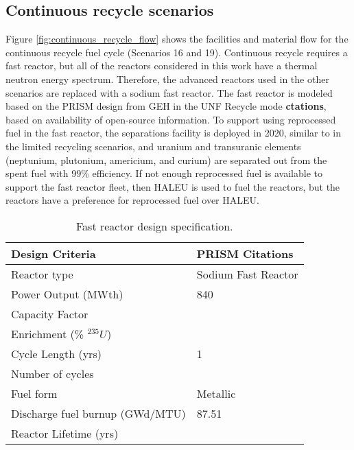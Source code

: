 \subsection{Continuous recycle scenarios}
Figure \ref{fig:continuous_recycle_flow} shows the facilities and material 
flow for the continuous recycle fuel cycle (Scenarios 16 and 19). Continuous recycle 
requires a fast reactor, but all of the reactors considered in this 
work have a thermal neutron energy spectrum. Therefore, the advanced 
reactors used in the other scenarios are replaced with a sodium fast 
reactor. The fast reactor is modeled based on the PRISM design from 
\gls{GEH} in the \gls{UNF} Recycle mode \textbf{ctations}, based on 
availability of open-source 
information. To support using reprocessed fuel in the fast reactor, 
the separations facility is deployed in 2020, similar to in the 
limited recycling scenarios, and uranium and transuranic elements 
(neptunium, plutonium, americium, and curium) are separated out from 
the spent fuel with 99\% efficiency. If not enough reprocessed fuel is 
available to support the fast reactor fleet, then \gls{HALEU} is used 
to fuel the reactors, but the reactors have a preference for reprocessed 
fuel over \gls{HALEU}. 



\begin{table}
    \centering
    \caption{Fast reactor design specification.}
    \label{tab:fast_rx}
    \begin{tabular}{l l}
        \hline
        Design Criteria & PRISM \textbf{Citations}\\
        \hline
        Reactor type & Sodium Fast Reactor\\
        Power Output (MWth) & 840 \\
        Capacity Factor &  \\
        Enrichment (\% $^{235}U$) &   \\
        Cycle Length (yrs) & 1 \\
        Number of cycles &  \\
        Fuel form &  Metallic \\
        Discharge fuel burnup (GWd/MTU) & 87.51 \\
        Reactor Lifetime (yrs)&  \\
        \hline
    \end{tabular}
\end{table}

